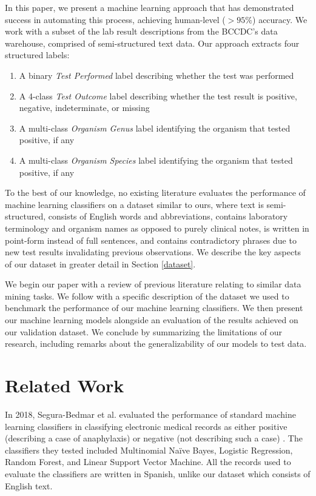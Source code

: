 \documentclass[sigconf]{acmart}
\newcommand{\naive}{Na\"ive }
\begin{document}
In this paper, we present a machine learning approach that has demonstrated success in automating this process, achieving human-level ($>95\%$) accuracy. We work with a subset of the lab result descriptions from the BCCDC's data warehouse, comprised of semi-structured text data. Our approach extracts four structured labels:

\begin{enumerate}
    \item A binary \textit{Test Performed} label describing whether the test was performed
    \item A 4-class \textit{Test Outcome} label describing whether the test result is positive, negative, indeterminate, or missing
    \item A multi-class \textit{Organism Genus} label identifying the organism that tested positive, if any
    \item A multi-class \textit{Organism Species} label identifying the organism that tested positive, if any
\end{enumerate}

To the best of our knowledge, no existing literature evaluates the performance of machine learning classifiers on a dataset similar to ours, where text is semi-structured, consists of English words and abbreviations, contains laboratory terminology and organism names as opposed to purely clinical notes, is written in point-form instead of full sentences, and contains contradictory phrases due to new test results invalidating previous observations. We describe the key aspects of our dataset in greater detail in Section \ref{dataset}.

We begin our paper with a review of previous literature relating to similar data mining tasks. We follow with a specific description of the dataset we used to benchmark the performance of our machine learning classifiers. We then present our machine learning models alongside an evaluation of the results achieved on our validation dataset. We conclude by summarizing the limitations of our research, including remarks about the generalizability of our models to test data.

\section{Related Work}

In 2018, Segura-Bedmar et al. evaluated the performance of standard machine learning classifiers in classifying electronic medical records as either positive (describing a case of anaphylaxis) or negative (not describing such a case) \cite{segura2018predicting}. The classifiers they tested included Multinomial \naive Bayes, Logistic Regression, Random Forest, and Linear Support Vector Machine. All the records used to evaluate the classifiers are written in Spanish, unlike our dataset which consists of English text.
\end{document}
